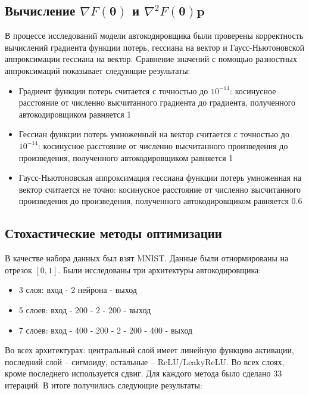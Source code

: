 \documentclass[12pt, a4paper]{article}
\begin{document}
        \subsection{Вычисление $\nabla F(\boldsymbol{\theta})$ и $\nabla^2 F(\boldsymbol{\theta}) \boldsymbol{p}$}
            В процессе исследований модели автокодировщика были проверены корректность вычислений градиента функции потерь, гессиана на вектор и Гаусс-Ньютоновской аппроксимации гессиана на вектор. Сравнение значений с помощью разностных аппроксимаций показывает следующие результаты:
            \begin{itemize}
                \item Градиент функции потерь считается с точностью до $10^{-14}$: косинусное расстояние от численно высчитанного градиента до градиента, полученного автокодировщиком равняется 1
                \item Гессиан функции потерь умноженный на вектор считается с точностью до $10^{-14}$: косинусное расстояние от численно высчитанного произведения до произведения, полученного автокодировщиком равняется 1
                \item Гаусс-Ньютоновская аппроксимация гессиана функции потерь умноженная на вектор считается не точно: косинусное расстояние от численно высчитанного произведения до произведения, полученного автокодировщиком равняется 0.6
            \end{itemize}

        \subsection{Стохастические методы оптимизации}
            В качестве набора данных был взят MNIST. Данные были отнормированы на отрезок $[0, 1]$. Были исследованы три архитектуры автокодировщика:
            \begin{itemize}
                \item 3 слоя: вход - 2 нейрона - выход
                \item 5 слоев: вход - 200 - 2 - 200 - выход
                \item 7 слоев: вход - 400 - 200 - 2 - 200 - 400 - выход
            \end{itemize}

            Во всех архитектурах: центральный слой имеет линейную функцию активации, последний слой -- сигмоиду, остальные -- ReLU/LeakyReLU. Во всех слоях, кроме последнего используется сдвиг. Для каждого метода было сделано 33 итераций. В итоге получились следующие результаты:
\end{document}
